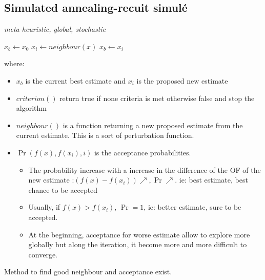 \documentclass[twocolumn]{article}
\numberwithin{equation}{section}
\begin{document}
	\subsection{Simulated annealing-recuit simulé}
\emph{meta-heuristic, global, stochastic}\\
\begin{framed}\begin{algorithmic}
\State $x_{b} \gets x_0$
	\State $x_i \gets neighbour(x)$
    	\State $x_{b}\gets x_i$
    \EndIf
\EndWhile
\end{algorithmic}\end{framed}
where:
\begin{itemize}
	\item $x_{b}$ is the current best estimate and $x_i$ is the proposed new estimate
	\item $criterion()$ return true if none criteria is met otherwise false and stop the algorithm
	\item $neighbour()$ is a function returning a new proposed estimate from the current estimate. This is a sort of perturbation function.
	\item $\Pr(f(x), f(x_i),i)$ is the acceptance probabilities. 
	\begin{itemize}
		\item The probability increase with a increase in the difference of the OF of the new estimate :$(f(x)-f(x_i)) \nearrow, \Pr \nearrow$. ie: best estimate, best chance to be accepted
		\item Usually, if $f(x)>f(x_i)$, $\Pr=1$, ie: better estimate, sure to be accepted.
		\item At the beginning, acceptance for worse estimate allow to explore more globally but along the iteration, it become more and more difficult to converge.
	\end{itemize}
\end{itemize}
Method to find good neighbour and acceptance exist.



 
 
 
 




	
	
\end{document}
